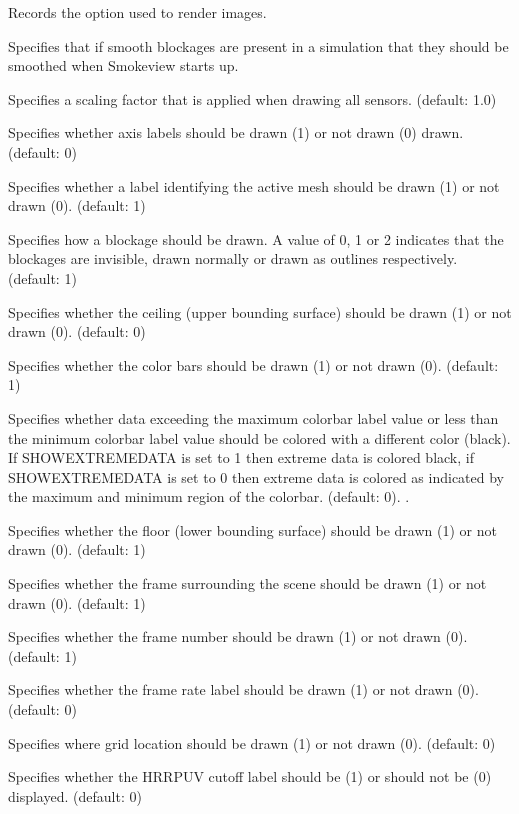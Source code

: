 \documentclass[11pt,twoside]{book}
\newcommand{\hitem}[1]{\item[{\bf #1} \hfill]}
\begin{document}
\hitem{RENDEROPTION} Records the option used to render images.

\hitem{SBATSTART} Specifies that if smooth blockages are present in a simulation that they should be
smoothed when Smokeview starts up.

\hitem{SENSORRELSIZE} Specifies a scaling factor that is applied when drawing all sensors.  (default: 1.0)

\hitem{SHOWAXISLABELS} Specifies whether axis labels should
be drawn (1) or not drawn (0) drawn. (default: 0)

\hitem{SHOWBLOCKLABEL} Specifies whether a label identifying the
active mesh should be drawn (1) or not drawn (0). (default: 1)

\hitem{SHOWBLOCKS}Specifies how a blockage should
be drawn.  A value of 0, 1 or 2 indicates that the blockages are
invisible, drawn normally or drawn as outlines respectively.  (default: 1)

\hitem{SHOWCADANDGRID}

\hitem{SHOWCEILING}Specifies whether
the ceiling (upper bounding surface) should be drawn (1) or not drawn (0).
(default: 0)


\hitem{SHOWCOLORBARS}Specifies whether
the color bars should be drawn (1) or not drawn (0).
(default: 1)

\hitem{SHOWEXTREMEDATA}Specifies whether data exceeding the maximum colorbar label value or less than the minimum colorbar label value should be colored with a different color (black).  If SHOWEXTREMEDATA is set to 1 then extreme data is colored black, if SHOWEXTREMEDATA is set to 0 then extreme data is colored as indicated by the maximum and minimum region of the colorbar. (default: 0).  .

\hitem{SHOWFLOOR}Specifies whether
the floor (lower bounding surface) should be drawn (1) or not drawn
(0).
(default: 1)

\hitem{SHOWFRAME} Specifies whether the frame surrounding
the scene should be drawn (1) or not drawn (0). (default:
1)

\hitem{SHOWFRAMELABEL} Specifies whether the frame number
should be drawn (1) or not drawn (0). (default: 1)

\hitem{SHOWFRAMERATE}Specifies whether
the frame rate label should be drawn (1) or not drawn (0).
(default: 0)

\hitem{SHOWGRIDLOC} Specifies where grid location should be drawn (1) or not drawn (0). (default: 0)

\hitem{SHOWHRRCUTOFF}Specifies whether the HRRPUV cutoff label should be (1) or should not be (0) displayed. (default: 0)
\end{document}
